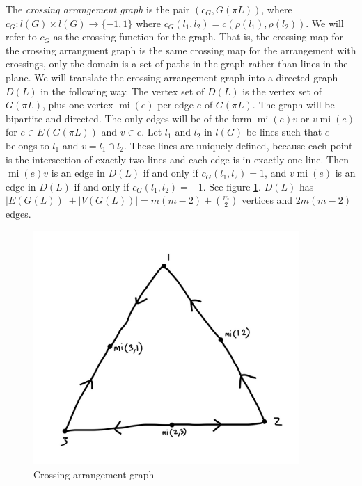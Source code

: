 \documentclass[11pt, oneside]{article}
\newcommand{\mi}{\operatorname{mi}}
\begin{document}
The \emph{crossing arrangement graph} is the pair $(c_G, G(\pi L))$, where $c_G: l(G) \times l(G) \to \{-1,1\}$ where $c_G(l_1, l_2) = c(\rho(l_1), \rho(l_2))$. We will refer to $c_G$ as the crossing function for the graph. That is, the crossing map for the crossing arrangment graph is the same crossing map for the arrangement with crossings, only the domain is a set of paths in the graph rather than lines in the plane. 
We will translate the crossing arrangement graph into a directed graph $D(L)$ in the following way. The vertex set of $D(L)$ is the vertex set of $G(\pi L)$, plus one vertex $\mi(e)$ per edge $e$ of $G(\pi L)$. The graph will be bipartite and directed. The only edges will be of the form $\mi(e)v$ or $v \mi(e)$ for $e \in E(G(\pi L))$ and $v \in e$. Let $l_1$ and $l_2$ in $l(G)$ be lines such that $e$ belongs to $l_1$ and $v = l_1 \cap l_2$. 
These lines are uniquely defined, because each point is the intersection of exactly two lines and each edge is in exactly one line. Then $\mi(e)v$ is an edge in $D(L)$ if and only if $c_G(l_1, l_2) = 1$, and $v \mi(e)$ is an edge in $D(L)$ if and only if $c_G(l_1, l_2) = -1$. See figure \ref{fig:second}. $D(L)$ has $|E(G(L))| +  |V(G(L))| = m(m-2) + { m \choose 2}$ vertices and $2m(m-2)$ edges. \\

\begin{figure}
\begin{minipage}{\linewidth}
\centering
\includegraphics[width=0.9\textwidth]{Digraph.jpeg}
\caption{Crossing arrangement graph}
\label{fig:second}
\end{minipage}
\end{figure}
\end{document}
